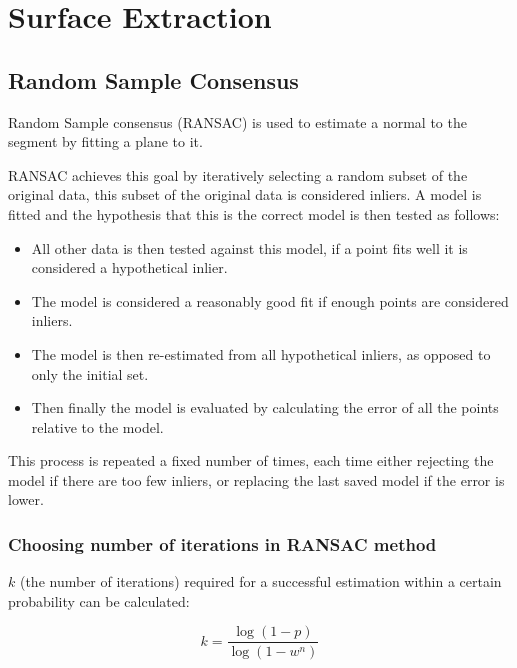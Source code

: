 	
\section{Surface Extraction}
	
		\subsection{Random Sample Consensus}
		\label{RANSAC expl}
			Random Sample consensus (RANSAC) is used to estimate a normal to the segment by fitting a plane to it.
			
			RANSAC achieves this goal by iteratively selecting a random subset of the original data, this subset of the original data is considered inliers. A model is fitted and the hypothesis that this is the correct model is then tested as follows:
			
			\begin{itemize}
				\item All other data is then tested against this model, if a point fits well it is considered a hypothetical inlier.
				
				\item The model is considered a reasonably good fit if enough points are considered inliers.
				
				\item The model is then re-estimated from all hypothetical inliers, as opposed to only the initial set.
				
				\item Then finally the model is evaluated by calculating the error of all the points relative to the model.
			\end{itemize}
			
			This process is repeated a fixed number of times, each time either rejecting the model if there are too few inliers, or replacing the last saved model if the error is lower.
			
			
			\subsubsection{Choosing number of iterations in RANSAC method}
				$k$ (the number of iterations) required for a successful estimation within a certain probability can be calculated:
				
				\begin{equation}
					k = \frac{\log(1-p)}{\log(1- w^n)}
				\end{equation}
				
